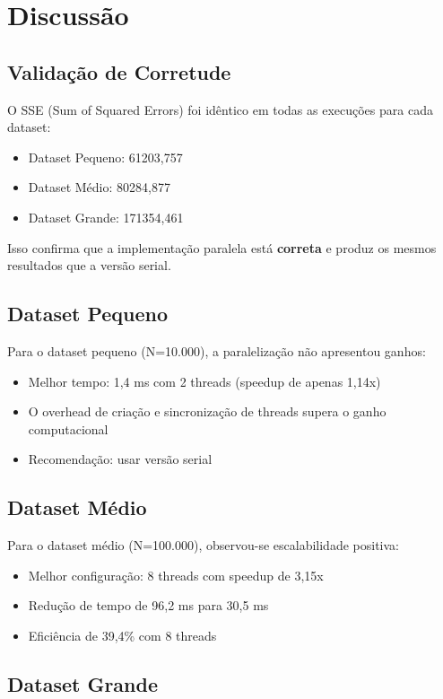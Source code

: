 \documentclass[12pt,a4paper]{article}
\begin{document}
\section{Discussão}

\subsection{Validação de Corretude}

O SSE (Sum of Squared Errors) foi idêntico em todas as execuções para cada dataset:
\begin{itemize}
    \item Dataset Pequeno: 61203,757
    \item Dataset Médio: 80284,877
    \item Dataset Grande: 171354,461
\end{itemize}

Isso confirma que a implementação paralela está \textbf{correta} e produz os mesmos resultados que a versão serial.

\subsection{Dataset Pequeno}

Para o dataset pequeno (N=10.000), a paralelização não apresentou ganhos:
\begin{itemize}
    \item Melhor tempo: 1,4 ms com 2 threads (speedup de apenas 1,14x)
    \item O overhead de criação e sincronização de threads supera o ganho computacional
    \item Recomendação: usar versão serial
\end{itemize}

\subsection{Dataset Médio}

Para o dataset médio (N=100.000), observou-se escalabilidade positiva:
\begin{itemize}
    \item Melhor configuração: 8 threads com speedup de 3,15x
    \item Redução de tempo de 96,2 ms para 30,5 ms
    \item Eficiência de 39,4\% com 8 threads
\end{itemize}

\subsection{Dataset Grande}
\end{document}
